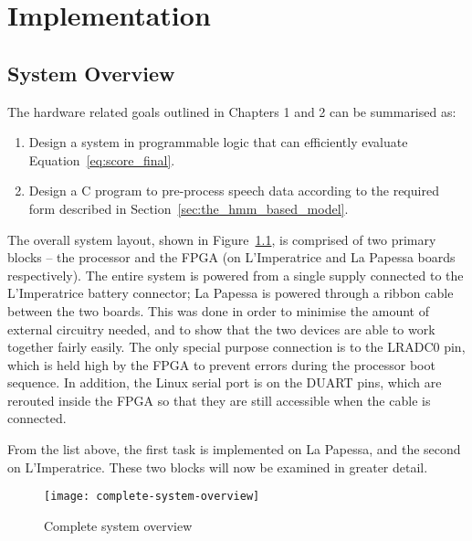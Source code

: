 \chapter{Implementation} %
\label{cha:system_design}

\section{System Overview} %
\label{sec:system_overview}
	The hardware related goals outlined in Chapters 1 and 2 can be summarised as:
	\begin{enumerate}
		\item Design a system in programmable logic that can efficiently evaluate Equation~\ref{eq:score_final}.
		\item Design a C program to pre-process speech data according to the required form described in Section~\ref{sec:the_hmm_based_model}.
	\end{enumerate}

	The overall system layout, shown in Figure~\ref{fig:hlsystem}, is comprised of two primary blocks -- the processor and the FPGA (on L'Imperatrice and La Papessa boards respectively).  The entire system is powered from a single supply connected to the L'Imperatrice battery connector; La Papessa is powered through a ribbon cable between the two boards.  This was done in order to minimise the amount of external circuitry needed, and to show that the two devices are able to work together fairly easily.  The only special purpose connection is to the LRADC0 pin, which is held high by the FPGA to prevent errors during the processor boot sequence.  In addition, the Linux serial port is on the DUART pins, which are rerouted inside the FPGA so that they are still accessible when the cable is connected.

	From the list above, the first task is implemented on La Papessa, and the second on L'Imperatrice.  These two blocks will now be examined in greater detail.



	\begin{figure}[tb]
		\begin{center}
			\texttt{[image: complete-system-overview]}
		\end{center}
		\caption{Complete system overview}
		\label{fig:hlsystem}
	\end{figure}


